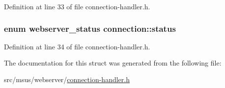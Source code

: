 Definition at line 33 of file connection-\/handler.\-h.

\hypertarget{structconnection_a70afd7d3c892d86014a13a5af6ce65e1}{
\subsubsection[{status}]{\setlength{\rightskip}{0pt plus 5cm}enum {\bf webserver\-\_\-status} connection\-::status}}\label{structconnection_a70afd7d3c892d86014a13a5af6ce65e1}


Definition at line 34 of file connection-\/handler.\-h.



The documentation for this struct was generated from the following file\-:\begin{DoxyCompactItemize}
\item 
src/msus/webserver/\hyperlink{connection-handler_8h}{connection-\/handler.\-h}\end{DoxyCompactItemize}
